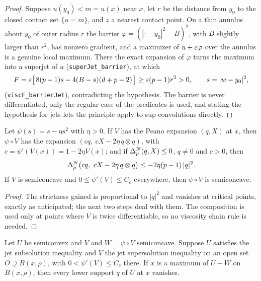\begin{proof}
\leanok
Suppose $u(y_0) < m = u(x)$ near $x$, let $r$ be the distance from $y_0$ to the
closed contact set $\{u = m\}$, and $z$ a nearest contact point. On a thin
annulus about $y_0$ of outer radius $r$ the barrier
$\varphi = (|\cdot - y_0|^2 - B)^2$, with $B$ slightly larger than $r^2$, has
nonzero gradient, and a maximizer of $u + \varepsilon\varphi$ over the annulus is a
genuine local maximum. There the exact expansion of $\varphi$ turns the
maximum into a superjet of $u$ (\texttt{superJet\_barrier}), at which
\[
  F = \varepsilon\bigl[\,8(p - 1)s - 4(B - s)(d + p - 2)\,\bigr] \ge \varepsilon(p-1)r^2 > 0,
  \qquad s = |w - y_0|^2,
\]
(\texttt{viscF\_barrierJet}), contradicting the hypothesis. The barrier is never
differentiated, only the regular case of the
predicates is used, and stating the hypothesis for jets lets the principle
apply to sup-convolutions directly.
\end{proof}


\begin{theorem}\label{thm:cv}
\leanok
Let $\psi(s) = s - \eta s^2$ with $\eta > 0$. If $V$ has the Peano expansion
$(q, X)$ at $x$, then $\psi \circ V$ has the expansion
$(c q,\ cX - 2\eta\, q \otimes q)$, with $c = \psi'(V(x)) = 1 - 2\eta V(x)$; and
if $\Delta_p^{N}(q, X) \le 0$, $q \ne 0$ and $c > 0$, then
\[
  \Delta_p^{N}\bigl(c q,\ cX - 2\eta\, q\otimes q\bigr) \le -2\eta(p - 1)\,|q|^2 .
\]
If $V$ is semiconcave and $0 \le \psi'(V) \le C_c$ everywhere, then
$\psi \circ V$ is semiconcave.
\end{theorem}

\begin{proof}
\leanok
The strictness gained is proportional to $|q|^2$ and vanishes at critical points,
exactly as anticipated; the next two steps deal
with them. The composition is used only at points where $V$ is twice
differentiable, so no viscosity chain rule is needed.
\end{proof}


\begin{theorem}\label{thm:step2}
\leanok
Let $U$ be semiconvex and $V$ and $W = \psi \circ V$ semiconcave. Suppose $U$
satisfies the jet subsolution inequality and $V$ the jet supersolution
inequality on an open set $O \supseteq B(x, \rho)$, with
$0 < \psi'(V) \le C_c$ there. If $x$ is a maximum of $U - W$ on $B(x, \rho)$,
then every lower support $q$ of $U$ at $x$ vanishes.
\end{theorem}

